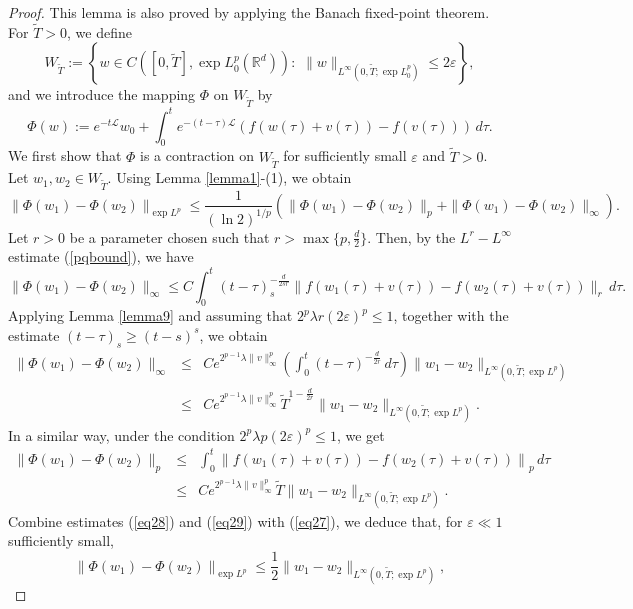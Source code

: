 \documentclass[a4paper,11pt]{amsart}
\numberwithin{equation}{section}
\theoremstyle{plain}
\theoremstyle{definition}
\begin{document}
\begin{proof} This lemma is also proved by applying the Banach fixed-point theorem. For $\widetilde{T}>0$, we define
$$W_{\widetilde{T}}:=\left\{w\in C([0,\widetilde{T}],\exp L^p_0(\mathbb{R}^d)):\,\,\|w\|_{L^\infty(0,\widetilde{T};\exp L^p_0)}\leq 2\varepsilon\right\},$$
and we introduce the mapping $\Phi$ on $ W_{\widetilde{T}}$ by
$$\Phi(w):=e^{-t\mathcal{L}}w_0+\int_0^te^{-(t-\tau)\mathcal{L}}\left(f(w(\tau)+v(\tau))-f(v(\tau))\right)\,d\tau.$$
We first show that $\Phi$ is a contraction on $W_{\widetilde{T}}$ for sufficiently small $\varepsilon$ and $\widetilde{T}>0$. Let $w_1,w_2\in W_{\widetilde{T}}$. Using Lemma \ref{lemma1}-(1), we obtain
\begin{equation}\label{eq27}
\|\Phi(w_1)-\Phi(w_2)\|_{\exp L^p}\leq \frac{1}{(\ln 2)^{1/p}}\left(\|\Phi(w_1)-\Phi(w_2)\|_{p}+\|\Phi(w_1)-\Phi(w_2)\|_{\infty}\right).
\end{equation}
Let $r>0$ be a parameter chosen such that $r>\max\{p,\frac{d}{2}\}$. Then, by the $L^r-L^\infty$ estimate (\ref{pqbound}), we have
$$\|\Phi(w_1)-\Phi(w_2)\|_{\infty}\leq C\int_0^t(t-\tau)_s^{-\frac{d}{2 s r}}\|f(w_1(\tau)+v(\tau))-f(w_2(\tau)+v(\tau))\|_r\,d\tau.$$
Applying Lemma \ref{lemma9} and assuming that $2^p\lambda r (2\varepsilon)^p\leq1$, together with the estimate $(t-\tau)_s\geq (t-s)^s$, we obtain
\begin{eqnarray}\label{eq28}
\|\Phi(w_1)-\Phi(w_2)\|_{\infty}&\leq& Ce^{2^{p-1}\lambda\|v\|_\infty^p}\left(\int_0^t(t-\tau)^{-\frac{d}{2 r}}\,d\tau\right)\|w_1-w_2\|_{L^\infty(0,\widetilde{T};\exp L^p)}\nonumber\\
&\leq& Ce^{2^{p-1}\lambda\|v\|_\infty^p}\widetilde{T}^{1-\frac{d}{2 r}}\|w_1-w_2\|_{L^\infty(0,\widetilde{T};\exp L^p)}.
\end{eqnarray}
In a similar way, under the condition $2^p\lambda p (2\varepsilon)^p\leq1$, we get
\begin{eqnarray}\label{eq29}
\|\Phi(w_1)-\Phi(w_2)\|_{p}&\leq& \int_0^t\left\|f(w_1(\tau)+v(\tau))-f(w_2(\tau)+v(\tau))\right\|_{p}\,d\tau\nonumber\\
&\leq& Ce^{2^{p-1}\lambda\|v\|_\infty^p}\widetilde{T}\|w_1-w_2\|_{L^\infty(0,\widetilde{T};\exp L^p)}.
\end{eqnarray}
Combine estimates (\ref{eq28}) and (\ref{eq29}) with (\ref{eq27}), we deduce that, for $\varepsilon\ll1$ sufficiently small,
\begin{equation}\label{eq30}
\|\Phi(w_1)-\Phi(w_2)\|_{\exp L^p}\leq \frac{1}{2}\|w_1-w_2\|_{L^\infty(0,\widetilde{T};\exp L^p)},

\end{equation}
\end{proof}
\end{document}
